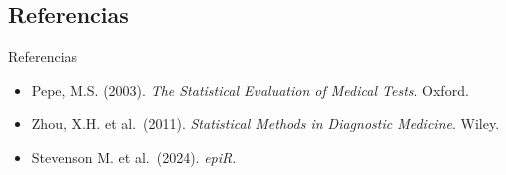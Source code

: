 \documentclass[
  ignorenonframetext,
  aspectratio=169,
]{beamer}
\providecommand{\tightlist}{%
  \setlength{\itemsep}{0pt}\setlength{\parskip}{0pt}}
\begin{document}
\begin{frame}
\end{frame}

\subsection{Referencias}\label{referencias}

\begin{frame}{Referencias}
\begin{itemize}
\tightlist
\item
  Pepe, M.S. (2003). \emph{The Statistical Evaluation of Medical Tests}.
  Oxford.
\item
  Zhou, X.H. et al.~(2011). \emph{Statistical Methods in Diagnostic
  Medicine}. Wiley.
\item
  Stevenson M. et al.~(2024). \emph{epiR}.
\end{itemize}
\end{frame}
\end{document}
